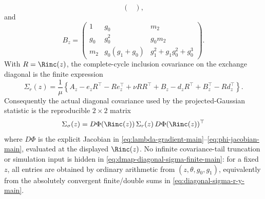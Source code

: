 \begin{proposition}
\[\begin{pmatrix}
\end{pmatrix},
\]
and
\[
B_z=
\begin{pmatrix}
1&g_0&m_2\\
g_0&g_0^2&g_0m_2\\
m_2&g_0(g_1+g_0)&g_1^2+g_1g_0^2+g_0^3
\end{pmatrix}.
\]
With \(R=\Rinc(z)\), the complete-cycle inclusion covariance on the exchange
diagonal is the finite expression
\begin{equation}\label{eq:dmap-diagonal-sigma-r-finite-main}
\Sigma_r(z)=\frac1\mu\left\{
A_z-e_zR^\top-Re_z^\top+\nu RR^\top
+B_z-d_zR^\top+B_z^\top-Rd_z^\top
\right\}.
\end{equation}
Consequently the actual diagonal covariance used by the projected-Gaussian
statistic is the reproducible \(2\times2\) matrix
\begin{equation}\label{eq:dmap-diagonal-sigma-finite-main}
\Sigma_\sigma(z)=D\Phi(\Rinc(z))\,\Sigma_r(z)\,D\Phi(\Rinc(z))^\top
\end{equation}
where \(D\Phi\) is the explicit Jacobian in
\eqref{eq:lambda-gradient-main}--\eqref{eq:phi-jacobian-main}, evaluated at
the displayed \(\Rinc(z)\).  No infinite covariance-tail truncation or simulation
input is hidden in \eqref{eq:dmap-diagonal-sigma-finite-main}: for a fixed
\(z\), all entries are obtained by ordinary arithmetic from
\((z,\theta,g_0,g_1)\), equivalently from the absolutely convergent
finite/double sums in \eqref{eq:diagonal-sigma-r-y-main}.
\end{proposition}

